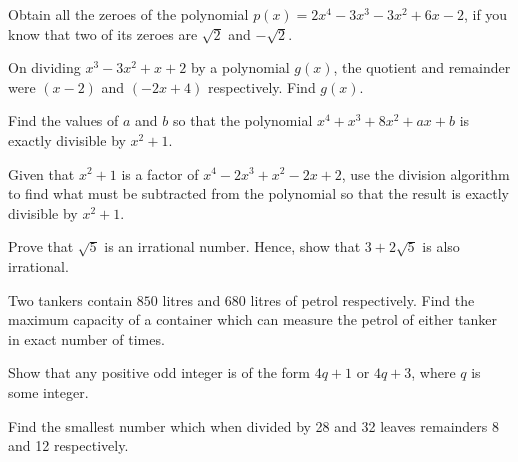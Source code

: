 \documentclass[12pt,a4paper]{exam}
\begin{document}
\begin{questions}
\question[5] Obtain all the zeroes of the polynomial $p(x) = 2x^4 - 3x^3 - 3x^2 + 6x - 2$, if you know that two of its zeroes are $\sqrt{2}$ and $-\sqrt{2}$.
\vspace{0.15cm}

\question[5] On dividing $x^3 - 3x^2 + x + 2$ by a polynomial $g(x)$, the quotient and remainder were $(x - 2)$ and $(-2x + 4)$ respectively. Find $g(x)$.
\vspace{0.15cm}

\question[5] Find the values of $a$ and $b$ so that the polynomial $x^4 + x^3 + 8x^2 + ax + b$ is exactly divisible by $x^2 + 1$.
\vspace{0.15cm}

\question[5] Given that $x^2 + 1$ is a factor of $x^4 - 2x^3 + x^2 - 2x + 2$, use the division algorithm to find what must be subtracted from the polynomial so that the result is exactly divisible by $x^2 + 1$.
\vspace{0.15cm}

\question[5] Prove that $\sqrt{5}$ is an irrational number. Hence, show that $3 + 2\sqrt{5}$ is also irrational.
\vspace{0.15cm}

\question[5] Two tankers contain $850$ litres and $680$ litres of petrol respectively. Find the maximum capacity of a container which can measure the petrol of either tanker in exact number of times.
\vspace{0.15cm}

\question[5] Show that any positive odd integer is of the form $4q + 1$ or $4q + 3$, where $q$ is some integer.
\vspace{0.15cm}

\question[5] Find the smallest number which when divided by 28 and 32 leaves remainders 8 and 12 respectively.
\vspace{0.15cm}

\end{questions}
\bigskip
\end{document}
